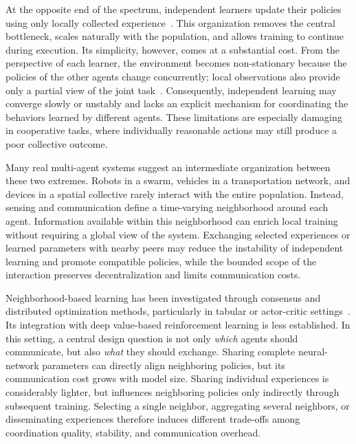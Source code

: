 At the opposite end of the spectrum, 
 independent learners update their policies using only locally collected experience~\cite{abed2016comparison}.
%
This organization removes the central bottleneck, 
 scales naturally with the population, 
 and allows training to continue during execution.
%
Its simplicity, however, comes at a substantial cost.
%
From the perspective of each learner, 
 the environment becomes non-stationary because the policies of the other agents change concurrently; 
 local observations also provide only a partial view of the joint task~\cite{DBLP:journals/tcyb/NguyenNN20}.
%
Consequently, 
 independent learning may converge slowly or unstably 
 and lacks an explicit mechanism for coordinating the behaviors learned by different agents.
%
These limitations are especially damaging in cooperative tasks, 
 where individually reasonable actions may still produce a poor collective outcome.

Many real multi-agent systems suggest an intermediate organization between these two extremes.
%
Robots in a swarm, vehicles in a transportation network, 
 and devices in a spatial collective rarely interact with the entire population.
%
Instead, 
 sensing and communication define a time-varying neighborhood around each agent.
% 
Information available within this neighborhood can enrich local training 
 without requiring a global view of the system.
%
Exchanging selected experiences or learned parameters with nearby peers 
 may reduce the instability of independent learning and promote compatible policies, 
 while the bounded scope of the interaction preserves decentralization 
 and limits communication costs.

Neighborhood-based learning has been investigated through consensus 
 and distributed optimization methods, 
 particularly in tabular or actor-critic settings~\cite{kar2012qd,zhang2018fully,DBLP:journals/jmlr/CiosekW20}.
%
Its integration with deep value-based reinforcement learning is less established.
%
In this setting, 
 a central design question is not only \emph{which} agents should communicate, 
 but also \emph{what} they should exchange.
%
Sharing complete neural-network parameters can directly align neighboring policies, 
 but its communication cost grows with model size.
%
Sharing individual experiences is considerably lighter, 
 but influences neighboring policies only indirectly through subsequent training.
%
Selecting a single neighbor, aggregating several neighbors, or disseminating experiences 
 therefore induces different trade-offs among coordination quality,
 stability, and communication overhead.

